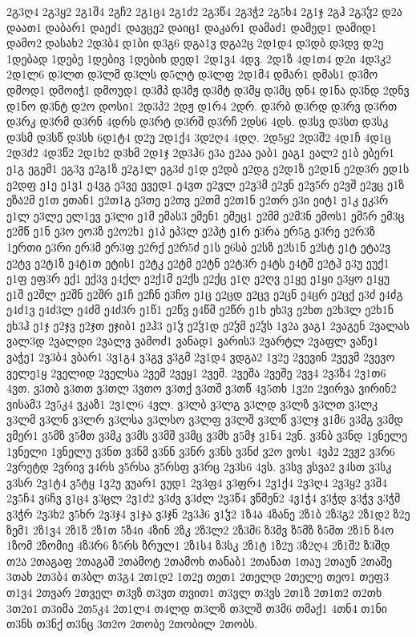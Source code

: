 {2გ3ღ4
2გ3ყ2
2გ1შ4
2გჩ2
2გ1ც4
2გ1ძ2
2გ3წ4
2გ3ჭ2
2გ5ხ4
2გ1ჯ
2გჰ
2გ3ჴ2
დ2ა
დაათ1
დაბარ1
დაეძ1
დავცე2
დაიც1
დაკარ1
დამაძ1
დამედ1
დამიდ1
დამო2
დასახ2
2დ3ბ4
დ1ბი
დ3გ6
დგა1ვ
დგა2ც
2დ1დ4
დ3დბ
დ3დვ
დ2ე
1დებად
1დებე
1დებივ
1დებიხ
დედ1
2დ1ვ4
4დვ.
2დ1ზ
4დ1თ4
დ2ი
4დ3კ2
2დ1ლ6
დ3ლთ
დ3ლმ
დ3ლს
დ5ლტ
დ3ლფ
2დ1მ4
დმარ1
დმას1
დ3მო
დმოდ1
დმოიჭ1
დმოუდ1
დ3მპ
დ3მჟ
დ3მტ
დ3მყ
დ3მც
დნ4
დ1ნა
დ3ნდ
2დნვ
დ1ნო
დ3ნტ
დ2ო
დოსი1
2დ3პ2
2დჟ
დ1რ4
2დრ.
დ3რბ
დ3რდ
დ3რვ
დ3რთ
დ3რკ
დ3რმ
დ3რნ
4დრს
დ3რტ
დ3რშ
დ3რჩ
2დს6
4დს.
დ3სვ
დ3სთ
დ3სკ
დ3სმ
დ3სწ
დ3სხ
6დ1ტ4
დ2უ
2დ1ქ4
3დ2ღ4
4დღ.
2დ5ყ2
2დ3შ2
4დ1ჩ
4დ1ც
2დ3ძ2
4დ3წ2
2დ1ხ2
დ3ხმ
2დ1ჯ
2დ3ჰ6
ე3ა
ე2აა
ეაბ1
ეაგ1
ეალ2
ე1ბ
ებერ1
ე1გ
ეგემ1
ეგ3ვ
ე2გ1ზ
ე2გ1ლ
ეგ3ძ
ე1დ
ე2დბ
ე2დგ
ე2დ1ზ
ე2დ1ნ
ე2დ3რ
ედ1ს
ე2დფ
ე1ე
ე1ვ1
ე4ვგ
ე3ვე
ევედ1
ე4ვთ
ე2ვლ
ე2ვ3მ
ე2ვნ
ე2ვ5რ
ე2ვშ
ე2ვც
ე1ზ
ეზა2მ
ე1თ
ეთან1
ე2თ1გ
ე3თე
ე2თვ
ე2თმ
ე2თ1ნ
ე2თრ
ე3ი
ეიტ1
ე1კ
ეკ3რ
ე1ლ
ე3ლე
ელ1ევ
ე3ლი
ე1მ
ემას3
ემენ1
ემეც1
ე2მმ
ე2მ3ნ
ემოს1
ემ5რ
ემ3ც
ე2მწ
ე1ნ
ე3ო
ეო3ზ
ე2ო2ხ1
ე1პ
ეპ3ლ
ე2პტ
ე1რ
ე3რა
ერ5გ
ე3რე
ე2რ3ზ
1ერთი
ე3რი
ერ3მ
ერ3ფ
ე2რქ
ე2რ5ძ
ე1ს
ე6სბ
ე2სზ
ე2ს1ნ
ე2სტ
ე1ტ
ეტა2ვ
ე2ტვ
ე2ტ1ზ
ე4ტ1თ
ეტის1
ე2ტკ
ე2ტმ
ე2ტნ
ე2ტ3რ
ე4ტს
ე4ტშ
ე2ტჰ
ე3უ
ეუქ1
ე1ფ
ეფ3რ
ექ1
ექ3ვ
ე4ქლ
ე2ქ1მ
ე2ქს
ე2ქც
ე1ღ
ე2ღვ
ე1ყე
ე1ყი
ე3ყო
ე1ყუ
ე1შ
ე2შლ
ე2შნ
ე2შრ
ე1ჩ
ე2ჩნ
ე3ჩო
ე1ც
ე2ცდ
ე2ცვ
ე2ცნ
ე4ცრ
ე2ცქ
ე3ძ
ე4ძგ
ე4ძ1ვ
ე4ძ3ლ
ე4ძმ
ე4ძ3რ
ე1წ1
ე2წვ
ე4წმ
ე2წრ
ე1ხ
ეხ3ვ
ე2ხთ
ე2ხ3ლ
ე2ხ1ნ
ეხ3ჰ
ე1ჯ
ე2ჯვ
ე2ჯთ
ეჯიბ1
ე2ჰ3
ე1ჴ
ე2ჴ1დ
ე2ჴმ
ე2ჴს
1ვ2ა
ვაგ1
2ვაგენ
2ვალას
ვალ3დ
2ვალდი
2ვალვ
ვამოძ1
ვანად1
ვარის3
2ვარტლ
2ვაფლ
ვაწე1
ვაჭე1
2ვ3ბ4
ვბარ1
3ვ1გ4
ვ3გვ
ვ3გმ
2ვ1დ4
ვდგა2
1ვ2ე
2ვევინ
2ვევმ
2ვევო
ველე1ყ
2ველიდ
2ველსა
2ვემ
2ვეყ1
2ვეშ.
2ვეშა
2ვეშე
2ვვ4
2ვ3ზ4
2ვ1თ6
4ვთ.
ვ3თბ
ვ3თთ
ვ3თლ
3ვთო
ვ3თქ
ვ3თშ
ვ3თწ
4ვ5თხ
1ვ2ი
2ვირვა
ვირინ2
ვისამ3
2ვ5კ4
ვკაზ1
2ვ1ლ6
4ვლ.
ვ3ლბ
ვ3ლგ
ვ3ლდ
ვ3ლზ
ვ3ლთ
ვ3ლკ
ვ3ლმ
ვ3ლნ
ვ3ლრ
ვ3ლსა
ვ3ლსო
ვ3ლფ
ვ3ლშ
ვ3ლწ
ვ3ლჯ
ვ1მ6
ვ3მგ
ვ3მდ
ვმერ1
ვ5მზ
ვ5მთ
ვ3მკ
ვ3მს
ვ3მშ
ვ3მც
ვ3მხ
ვ5მჯ
ვ1ნ4
2ვნ.
ვ3ნბ
ვ3ნდ
1ვნელე
1ვნელი
1ვნელუ
ვ3ნთ
ვ3ნმ
ვ3ნნ
ვ3ნრ
ვ3ნს
ვ3ნძ
ვ2ო
ვოს1
4ვპ2
2ვჟ2
ვ3რ6
2ვრეტდ
2ვრივ
ვ4რს
ვ5რსა
ვ5რსფ
ვ3რც
2ვ3ს6
4ვს.
ვ3სვ
ვსვა2
ვ4სთ
ვ3სკ
ვ3სრ
2ვ1ტ4
ვ5ტყ
1ვ2უ
ვუარ1
ვუდ1
2ვ3ფ4
ვ3ფრ4
2ვ1ქ4
2ვ3ღ4
2ვ3ყ2
ვ3შ4
2ვ5ჩ4
ვ6ჩვ
ვ1ც4
ვ3ცლ
2ვ1ძ2
ვ3ძვ
ვ3ძლ
2ვ3წ4
ვწმენ2
4ვ1ჭ4
ვ3ჭდ
ვ3ჭვ
ვ3ჭმ
ვ3ჭრ
2ვ3ხ2
ვ5ხრ
2ვ3ჯ4
ვ1ჯა
ვ3ჯნ
2ვ3ჰ6
ვ1ჴ2
1ზ4ა
4ზანე
2ზ1ბ
2ზ3გ2
2ზ1დ2
ზ2ე
ზემ1
2ზ1ვ4
2ზ1ზ
2ზ1თ
5ზ4ი
4ზინ
2ზკ
2ზ3ლ2
2ზ3მ6
ზ3მვ
ზ5მზ
ზ5მთ
2ზ1ნ
ზ4ო
1ზომ
2ზომიე
4ზ3რ6
ზ5რს
ზრულ1
2ზ1ს4
ზ3სკ
2ზ1ტ
1ზ2უ
3ზ2ღ4
2ზ1შ2
ზ3შდ
თ2ა
2თაგაფ
2თაგაშ
2თამოტ
2თამოხ
თანაბ1
2თანათ
1თაუ
2თაუნ
2თაშე
3თახ
2თ3ბ4
თ3ბლ
თ3გ4
2თ1დ2
1თ2ე
თეთ1
2თელდ
2თელე
თეო1
თეფ3
თ1ვ4
2თვარ
2თველ
თ3ვზ
თ3ვთ
თვით1
თ3ვლ
თ3ვს
2თ1ზ
2თ1თ2
თ2თხ
3თ2ი1
თ3იმა
2თ5კ4
2თ1ლ4
თ4ლდ
თ3ლზ
თ3ლშ
თ3მ6
თმაქ1
4თნ4
თ1ნი
თ3ნს
თ3ნქ
თ3ნც
3თ2ო
2თობე
2თობილ
2თობს.
}

